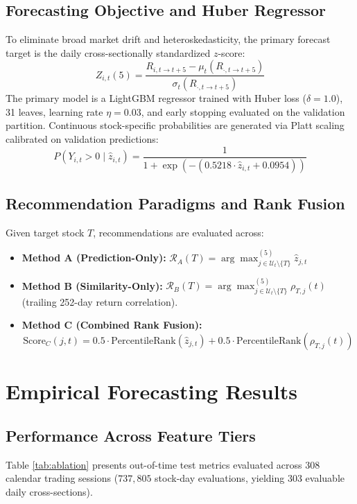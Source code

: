 \documentclass[11pt,a4paper]{article}
\begin{document}
\subsection{Forecasting Objective and Huber Regressor}
To eliminate broad market drift and heteroskedasticity, the primary forecast target is the daily cross-sectionally standardized $z$-score:
\begin{equation}
Z_{i, t}(5) = \frac{R_{i, t \to t+5} - \mu_t(R_{\cdot, t \to t+5})}{\sigma_t(R_{\cdot, t \to t+5})}
\end{equation}
The primary model is a LightGBM regressor \cite{ke2017lightgbm} trained with Huber loss ($\delta = 1.0$), 31 leaves, learning rate $\eta = 0.03$, and early stopping evaluated on the validation partition. Continuous stock-specific probabilities are generated via Platt scaling calibrated on validation predictions:
\begin{equation}
P(Y_{i, t} > 0 \mid \hat{z}_{i, t}) = \frac{1}{1 + \exp\left(-(0.5218 \cdot \hat{z}_{i, t} + 0.0954)\right)}
\end{equation}

\subsection{Recommendation Paradigms and Rank Fusion}
Given target stock $T$, recommendations are evaluated across:
\begin{itemize}
    \item \textbf{Method A (Prediction-Only):} $\mathcal{R}_A(T) = \arg\max_{j \in \mathcal{U}_t \setminus \{T\}}^{(5)} \hat{z}_{j, t}$
    \item \textbf{Method B (Similarity-Only):} $\mathcal{R}_B(T) = \arg\max_{j \in \mathcal{U}_t \setminus \{T\}}^{(5)} \rho_{T, j}(t)$ (trailing 252-day return correlation).
    \item \textbf{Method C (Combined Rank Fusion):}
    \begin{equation}
    \text{Score}_C(j, t) = 0.5 \cdot \text{PercentileRank}(\hat{z}_{j, t}) + 0.5 \cdot \text{PercentileRank}(\rho_{T, j}(t))
    \end{equation}
\end{itemize}

\section{Empirical Forecasting Results}

\subsection{Performance Across Feature Tiers}
Table \ref{tab:ablation} presents out-of-time test metrics evaluated across 308 calendar trading sessions ($737,805$ stock-day evaluations, yielding 303 evaluable daily cross-sections).
\end{document}

